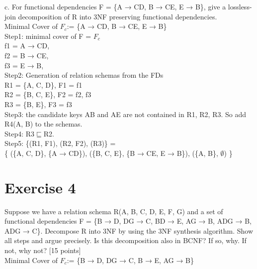 \documentclass[]{article}
\begin{document}
	\noindent c. For functional dependencies F = \{A → CD, B → CE, E → B\}, give a lossless-join decomposition of R into 3NF preserving functional dependencies.  \\
	
	\noindent Minimal Cover of $F_{c}$:=  \{A → CD, B → CE, E → B\} \\
	
	\noindent Step1: minimal cover of F = $F_{c}$  \\
	
	f1 = A → CD,\\
	
	f2 = B → CE,\\
	
	f3 = E → B, \\
	
	\noindent Step2: Generation of relation schemas from the FDs  \\
	
	R1 = \{A, C, D\}, F1 = f1 \\
	
	R2 = \{B, C, E\}, F2 = f2, f3 \\
	
	R3 = \{B, E\}, F3 = f3 \\
	
	\noindent Step3: the candidate keys AB and AE are not contained in R1, R2, R3. So add R4(A, B) to the schemas. \\
	
	\noindent Step4: R3$\sqsubseteq$R2.  \\
	
	\noindent Step5: \{(R1, F1), (R2, F2), (R3)\} = \\
	
	\{
	(\{A, C, D\}, \{A → CD\}), 
	(\{B, C, E\}, \{B → CE, E → B\}),
	(\{A, B\}, $\emptyset$)
	\}  \\
	
	\section{Exercise 4}
	
	Suppose we have a relation schema R(A, B, C, D, E, F, G) and a set of functional dependencies F = \{B → D, DG → C, BD → E, AG → B, ADG → B, ADG → C\}. Decompose R into 3NF by using the 3NF synthesis algorithm. Show all steps and argue precisely. Is this decomposition also in BCNF? If so, why. If not, why not? [15 points]  \\
	
	\noindent Minimal Cover of $F_{c}$:=  \{B → D, DG → C, B → E, AG → B\} \\
	
\end{document}
